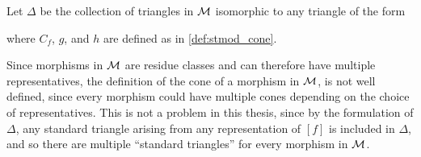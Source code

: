 \begin{definition}
    \label{def:stmod_delta}
    Let \( \Delta \) be the collection of triangles in \( {\mathcal{M}} \) isomorphic to any triangle of the form
    \begin{center}
    \end{center}
    where \( C_f \), \( g \), and \( h \) are defined as in \autoref{def:stmod_cone}.
\end{definition}

Since morphisms in \( {\mathcal{M}} \) are residue classes and can therefore have multiple representatives, the definition of the cone of a morphism in \( {\mathcal{M}} \), is not well defined, since every morphism could have multiple cones depending on the choice of representatives. This is not a problem in this thesis, since by the formulation of \( \Delta \), any standard triangle arising from any representation of \( [f] \) is included in \( \Delta \), and so there are multiple ``standard triangles'' for every morphism in \( {\mathcal{M}} \).

